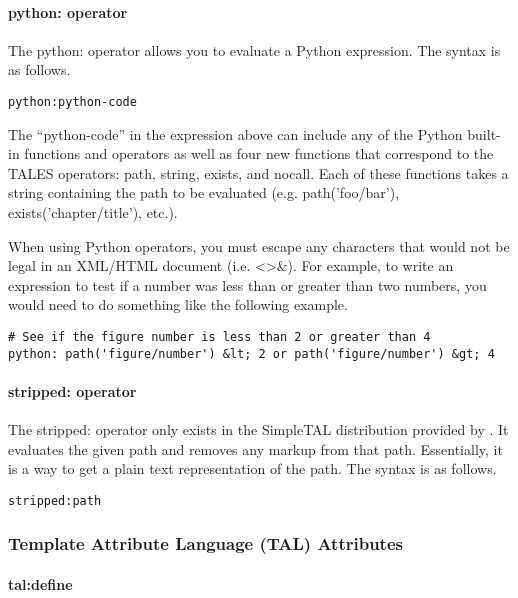 \paragraph{python: operator}

The python: operator allows you to evaluate a Python expression.  The
syntax is as follows.
\begin{verbatim}
python:python-code
\end{verbatim}

The ``python-code'' in the expression above can include any of the Python
built-in functions and operators as well as four new functions that
correspond to the TALES operators: path, string, exists, and nocall.
Each of these functions takes a string containing the path to be 
evaluated (e.g. path('foo/bar'), exists('chapter/title'), etc.).

When using Python operators, you must escape any characters that would
not be legal in an XML/HTML document (i.e. <>\&).  For example, 
to write an expression to test if a number was less than or greater than
two numbers, you would need to do something like the following example.
\begin{verbatim}
# See if the figure number is less than 2 or greater than 4
python: path('figure/number') &lt; 2 or path('figure/number') &gt; 4
\end{verbatim}


\paragraph{stripped: operator}

The stripped: operator only exists in the SimpleTAL distribution provided
by \plasTeX.  It evaluates the given path and removes any markup from
that path.  Essentially, it is a way to get a plain text representation
of the path.  The syntax is as follows.
\begin{verbatim}
stripped:path
\end{verbatim}


\subsubsection{Template Attribute Language (TAL) Attributes\label{sec:talattributes}}

\paragraph{tal:define}

